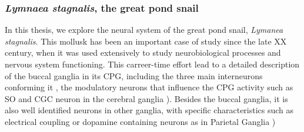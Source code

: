 \subsubsection{\textit{Lymnaea stagnalis}, the great pond snail}
In this thesis, we explore the neural system of the great pond snail, \textit{Lymanea stagnalis}. This mollusk has been an important case of study since the late XX century, when it was used extensively to study neurobiological processes and nervous system functioning. This carreer-time effort lead to a detailed description of the buccal ganglia 
in its CPG, including the three main interneurons conforming it \parencite{benjamin_snail_1989,benjamin_morphology_1979,rose_relationship_1979,brierley_behavioral_1997}, the modulatory neurons that influence the CPG activity such as SO and CGC neuron in the cerebral ganglia \parencite{rose_interneuronal_1981,mccrohan_patterns_1980,kemenes_multiple_2001}). Besides the buccal ganglia, it is also well identified neurons in other ganglia, with specific characteristics such as electrical coupling or dopamine containing neurons as in Parietal Ganglia \parencite{benjamin_electrotonic_1986,winlow_multiple_1981})

